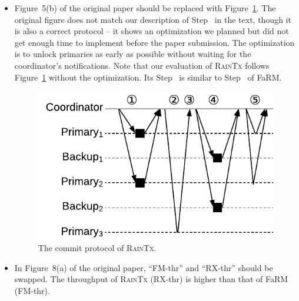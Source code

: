 \documentclass[letterpaper,10pt,twocolumn]{article}
\begin{document}
\begin{itemize}

\item Figure~5(b) of the original paper should be replaced with Figure~\ref{fig:raintx-commit}.
The original figure does not match our description of Step~ in the text, though it is also a correct protocol -- it shows an optimization we planned but did not get enough time to implement before the paper submission.
The optimization is to unlock primaries as early as possible without waiting for the coordinator's notifications.
Note that our evaluation of \textsc{RainTx} follows Figure~\ref{fig:raintx-commit} without the optimization.
Its Step~ is similar to Step~ of FaRM.

\begin{figure}[!h]
  \centering
  \includegraphics[width=0.7\linewidth]{figures/raintx-commit}
  \caption{The commit protocol of \textsc{RainTx}.}
  \label{fig:raintx-commit}
\end{figure}

\item In Figure~8(a) of the original paper, ``FM-thr'' and ``RX-thr'' should be swapped.
The throughput of \textsc{RainTx} (RX-thr) is higher than that of FaRM (FM-thr).

\end{itemize}
\end{document}
